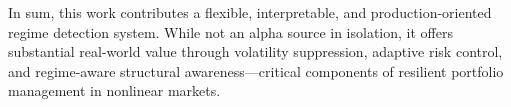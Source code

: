 In sum, this work contributes a flexible, interpretable, and production-oriented regime detection system. While not an alpha source in isolation, it offers substantial real-world value through volatility suppression, adaptive risk control, and regime-aware structural awareness—critical components of resilient portfolio management in nonlinear markets.
